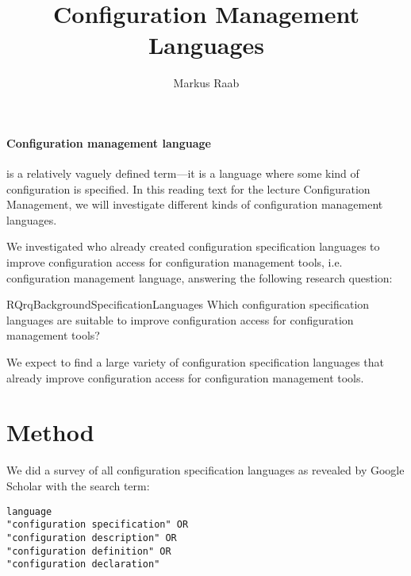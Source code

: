 



\setcounter{chapter}{1} %


\title{Configuration Management Languages}
\author{Markus Raab}




\begin{titlingpage}
\maketitle
\doclicenseThis
\end{titlingpage}

\paragraph{Configuration management language}
is a relatively vaguely defined term---it is a language where some kind of configuration is specified.
In this reading text for the lecture Configuration Management, we will investigate different kinds of configuration management languages.

We investigated who already created configuration specification languages to improve configuration access for configuration management tools, i.e. configuration management language, answering the following research question:
\begin{restatable}{RQ}{rqBackgroundSpecificationLanguages}
 \label{rq:background-specification-languages}
 Which configuration specification languages are suitable to improve configuration access for configuration management tools?
\end{restatable}

\begin{hypothesis}
We expect to find a large variety of configuration specification languages that already improve configuration access for configuration management tools.
\end{hypothesis}

\section{Method}

We did a survey of all configuration specification languages as revealed by Google Scholar with the search term:
\begin{verbatim}
language
"configuration specification" OR
"configuration description" OR
"configuration definition" OR
"configuration declaration"
\end{verbatim}


